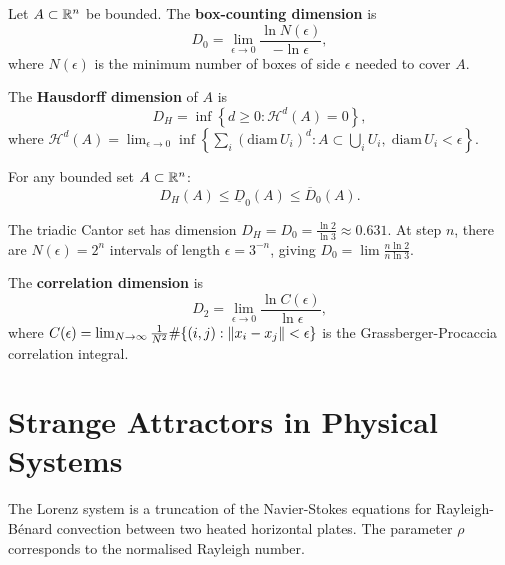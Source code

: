 \begin{definition}
Let $A \subset \mathbb{R}^n$ be bounded. The \textbf{box-counting dimension} is
\[
    D_0 = \lim_{\epsilon \to 0} \frac{\ln N(\epsilon)}{-\ln\epsilon},
\]
where $N(\epsilon)$ is the minimum number of boxes of side $\epsilon$ needed
to cover $A$.
\end{definition}

\begin{definition}
The \textbf{Hausdorff dimension} of $A$ is
\[
    D_H = \inf\left\{ d \geq 0 : \mathcal{H}^d(A) = 0 \right\},
\]
where $\mathcal{H}^d(A) = \lim_{\epsilon \to 0} \inf\left\{
\sum_i (\mathrm{diam}\, U_i)^d : A \subset \bigcup_i U_i,\;
\mathrm{diam}\, U_i < \epsilon \right\}$.
\end{definition}

\begin{proposition}
For any bounded set $A \subset \mathbb{R}^n$:
\[
    D_H(A) \leq \underline{D}_0(A) \leq \overline{D}_0(A).
\]
\end{proposition}

\begin{example}
The triadic Cantor set has dimension
$D_H = D_0 = \frac{\ln 2}{\ln 3} \approx 0.631$.
At step $n$, there are $N(\epsilon) = 2^n$ intervals of length
$\epsilon = 3^{-n}$, giving $D_0 = \lim \frac{n\ln 2}{n\ln 3}$.
\end{example}

\begin{definition}
The \textbf{correlation dimension} is
\[
    D_2 = \lim_{\epsilon \to 0} \frac{\ln C(\epsilon)}{\ln\epsilon},
\]
where $C(\epsilon) = \lim_{N \to \infty} \frac{1}{N^2}\#\{(i,j) :
\left\| x_i - x_j \right\| < \epsilon\}$ is the Grassberger-Procaccia correlation
integral.
\end{definition}

\section{Strange Attractors in Physical Systems}

\begin{example}
The Lorenz system is a truncation of the Navier-Stokes equations for
Rayleigh-B\'enard convection between two heated horizontal plates. The
parameter $\rho$ corresponds to the normalised Rayleigh number.
\end{example}

